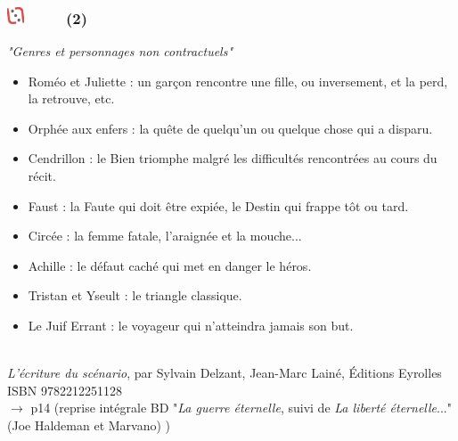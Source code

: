 \documentclass[slidetop,11pt]{beamer}
\def\moreInFrameTitleLeftt{\includegraphics[height=0.5cm]{img/ligueludique-0.png}~~~~~}
\begin{document}

\begin{frame}
	\frametitle{\moreInFrameTitleLeftt \sectionPartIIaII  (2)}
	\emph{"Genres et personnages non contractuels"}
	\begin{itemize}
		\footnotesize
		\item Rom{\'e}o et Juliette : un gar\c{c}on rencontre une fille, ou inversement, et la perd, la retrouve, etc. 
		\item Orph{\'e}e aux enfers : la qu{\^e}te de quelqu'un ou quelque chose qui a disparu. 
		\item Cendrillon : le Bien triomphe malgr{\'e} les difficult{\'e}s rencontr{\'e}es au cours du r{\'e}cit. 
		\item Faust : la Faute qui doit {\^e}tre expi{\'e}e, le Destin qui frappe t{\^o}t ou tard. 
		\item Circ{\'e}e : la femme fatale, l'araign{\'e}e et la mouche... 
		\item Achille : le d{\'e}faut cach{\'e} qui met en danger le h{\'e}ros. 
		\item Tristan et Yseult : le triangle classique. 
		\item Le Juif Errant : le voyageur qui n'atteindra jamais son but. 
	\end{itemize}~\\
	
	\emph{L'{\'e}criture du sc{\'e}nario}, par Sylvain Delzant, Jean-Marc Lain{\'e}, {\'E}ditions Eyrolles ISBN 9782212251128~\\
	$\rightarrow$ p14 (reprise int{\'e}grale BD "\emph{La guerre {\'e}ternelle}, suivi de \emph{La libert{\'e} {\'e}ternelle}..." (Joe Haldeman et Marvano) )
\end{frame}
\end{document}

